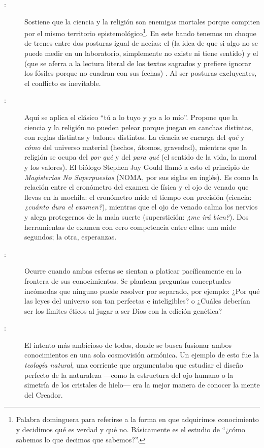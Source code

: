 \begin{description}
	\item[:] Sostiene que la ciencia y la religión son enemigas mortales porque compiten por el mismo territorio epistemológico\footnote{Palabra dominguera para referirse a la forma en que adquirimos conocimiento y decidimos qué es verdad y qué no. Básicamente es el estudio de “¿cómo sabemos lo que decimos que sabemos?”.}.
	      En este bando tenemos un choque de trenes entre dos posturas igual de necias: el  (la idea de que si algo no se puede medir en un laboratorio, simplemente no existe ni tiene sentido) y el  (que se aferra a la lectura literal de los textos sagrados y prefiere ignorar los fósiles porque no cuadran con sus fechas) \cite{Harrison2015}.
	      Al ser posturas excluyentes, el conflicto es inevitable.

	\item[:] Aquí se aplica el clásico “tú a lo tuyo y yo a lo mío”.
	      Propone que la ciencia y la religión no pueden pelear porque juegan en canchas distintas, con reglas distintas y balones distintos.
	      La ciencia se encarga del \emph{qué} y \emph{cómo} del universo material (hechos, átomos, gravedad), mientras que la religión se ocupa del \emph{por qué} y del \emph{para qué} (el sentido de la vida, la moral y los valores).
	      El biólogo Stephen Jay Gould llamó a esto el principio de \emph{Magisterios No Superpuestos} (NOMA, por sus siglas en inglés)\cite{Gould1999}.
	      Es como la relación entre el cronómetro del examen de física y el ojo de venado que llevas en la mochila: el cronómetro mide el tiempo con precisión (ciencia: \emph{¿cuánto dura el examen?}), mientras que el ojo de venado calma los nervios y alega protegernos de la mala suerte (superstición: \emph{¿me irá bien?}).
	      Dos herramientas de examen con cero competencia entre ellas: una mide segundos; la otra, esperanzas.

	\item[:] Ocurre cuando ambas esferas se sientan a platicar pacíficamente en la frontera de sus conocimientos.
	      Se plantean preguntas conceptuales incómodas que ninguno puede resolver por separado, por ejemplo: ¿Por qué las leyes del universo son tan perfectas e inteligibles?
	      o ¿Cuáles deberían ser los límites éticos al jugar a ser Dios con la edición genética?

	\item[:] El intento más ambicioso de todos, donde se busca fusionar ambos conocimientos en una sola cosmovisión armónica.
	      Un ejemplo de esto fue la \emph{teología natural}, una corriente que argumentaba que estudiar el diseño perfecto de la naturaleza —como la estructura del ojo humano o la simetría de los cristales de hielo— era la mejor manera de conocer la mente del Creador.
\end{description}


